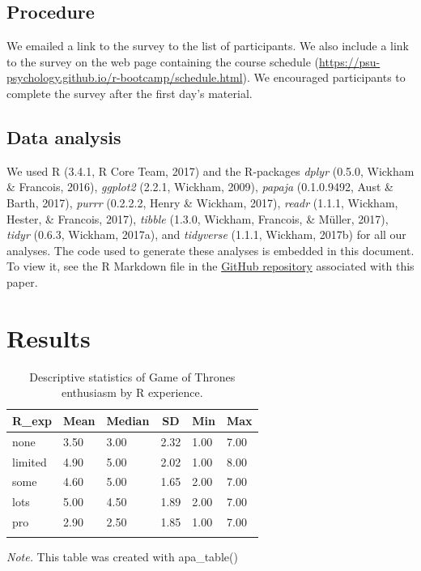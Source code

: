 \documentclass[english,man]{apa6}
\theoremstyle{definition}
\theoremstyle{definition}
\theoremstyle{remark}
\begin{document}
\subsection{Procedure}\label{procedure}

We emailed a link to the survey to the list of participants. We also
include a link to the survey on the web page containing the course
schedule
(\url{https://psu-psychology.github.io/r-bootcamp/schedule.html}). We
encouraged participants to complete the survey after the first day's
material.

\subsection{Data analysis}\label{data-analysis}

We used R (3.4.1, R Core Team, 2017) and the R-packages \emph{dplyr}
(0.5.0, Wickham \& Francois, 2016), \emph{ggplot2} (2.2.1, Wickham,
2009), \emph{papaja} (0.1.0.9492, Aust \& Barth, 2017), \emph{purrr}
(0.2.2.2, Henry \& Wickham, 2017), \emph{readr} (1.1.1, Wickham, Hester,
\& Francois, 2017), \emph{tibble} (1.3.0, Wickham, Francois, \& Müller,
2017), \emph{tidyr} (0.6.3, Wickham, 2017a), and \emph{tidyverse}
(1.1.1, Wickham, 2017b) for all our analyses. The code used to generate
these analyses is embedded in this document. To view it, see the R
Markdown file in the
\href{http://github.com/psu-psychology/r-bootcamp/papaja-demo/}{GitHub
repository} associated with this paper.

\section{Results}\label{results}

\begin{table}[tbp]
\begin{center}
\begin{threeparttable}
\caption{\label{tab:GoT-by-experience}Descriptive statistics of Game of Thrones enthusiasm by R experience.}
\begin{tabular}{llllll}
\toprule
R\_exp & \multicolumn{1}{c}{Mean} & \multicolumn{1}{c}{Median} & \multicolumn{1}{c}{SD} & \multicolumn{1}{c}{Min} & \multicolumn{1}{c}{Max}\\
\midrule
none & 3.50 & 3.00 & 2.32 & 1.00 & 7.00\\
limited & 4.90 & 5.00 & 2.02 & 1.00 & 8.00\\
some & 4.60 & 5.00 & 1.65 & 2.00 & 7.00\\
lots & 5.00 & 4.50 & 1.89 & 2.00 & 7.00\\
pro & 2.90 & 2.50 & 1.85 & 1.00 & 7.00\\
\bottomrule
\addlinespace
\end{tabular}
\begin{tablenotes}[para]
\textit{Note.} This table was created with apa\_table()
\end{tablenotes}
\end{threeparttable}
\end{center}
\end{table}
\end{document}
